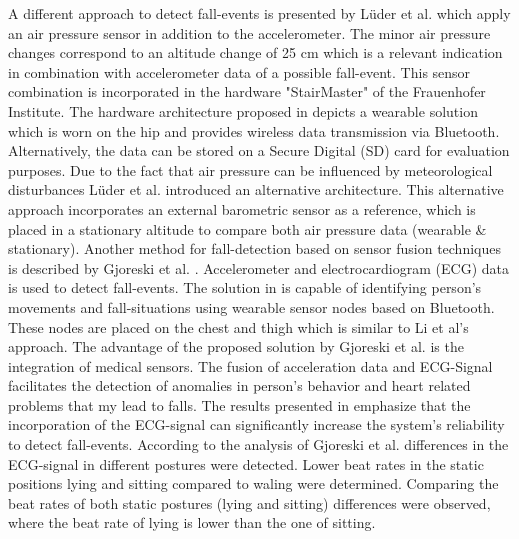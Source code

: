 \documentclass[review]{elsarticle}
\begin{document}
A different approach to detect fall-events is presented by Lüder et al. \cite{Luder2009} which apply an air pressure sensor in addition to the accelerometer. The minor air pressure changes correspond to an altitude change of 25 cm which is a relevant indication in combination with accelerometer data of a possible fall-event.  This sensor combination is incorporated in the hardware "StairMaster" of the Frauenhofer Institute. The hardware architecture proposed in \cite{Luder2009} depicts a wearable solution which is worn on the hip and provides wireless data transmission via Bluetooth. Alternatively, the data can be stored on a Secure Digital (SD) card for evaluation purposes. Due to the fact that air pressure can be influenced by meteorological disturbances Lüder et al. \cite{Luder2009} introduced an alternative architecture. This alternative approach incorporates an external barometric sensor as a reference, which is placed in a stationary altitude to compare both air pressure data (wearable \& stationary). Another method for fall-detection based on sensor fusion techniques is described by Gjoreski et al. \cite{Gjoreski2014}. Accelerometer and electrocardiogram (ECG) data is used to detect fall-events. The solution in \cite{Gjoreski2014} is capable of identifying person's movements and fall-situations using wearable sensor nodes based on Bluetooth. These nodes are placed on the chest and thigh which is similar to Li et al's \cite{Li2009} approach. The advantage of the proposed solution by Gjoreski et al. \cite{Gjoreski2014} is the integration of medical sensors. The fusion of acceleration data and ECG-Signal facilitates the detection of anomalies in person's behavior and heart related problems that my lead to falls. The results presented in \cite{Gjoreski2014} emphasize that the incorporation of the ECG-signal can significantly increase the system's reliability to detect fall-events. According to the analysis of Gjoreski et al. \cite{Gjoreski2014} differences in the ECG-signal in different postures were detected. Lower beat rates in the static positions lying and sitting compared to waling were determined. Comparing the beat rates of both static postures (lying and sitting) differences were observed, where the beat rate of lying is lower than the one of sitting.
\end{document}
